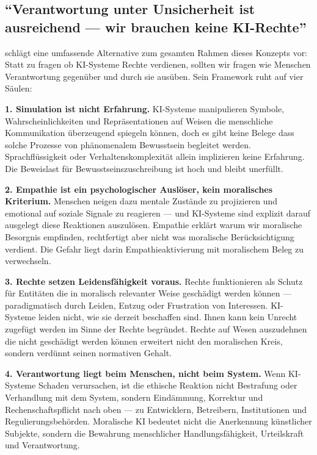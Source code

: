 \documentclass[acmcp, noacm]{acmart}
\begin{document}
\subsection{``Verantwortung unter Unsicherheit ist ausreichend --- wir brauchen keine KI-Rechte'' \cite{matta2026}}

\cite{matta2026} schlägt eine umfassende Alternative zum gesamten Rahmen dieses Konzepts vor: Statt zu fragen ob KI-Systeme Rechte verdienen, sollten wir fragen wie Menschen Verantwortung gegenüber und durch sie ausüben. Sein Framework ruht auf vier Säulen:

\textbf{1. Simulation ist nicht Erfahrung.} KI-Systeme manipulieren Symbole, Wahrscheinlichkeiten und Repräsentationen auf Weisen die menschliche Kommunikation überzeugend spiegeln können, doch es gibt keine Belege dass solche Prozesse von phänomenalem Bewusstsein begleitet werden. Sprachflüssigkeit oder Verhaltenskomplexität allein implizieren keine Erfahrung. Die Beweislast für Bewusstseinszuschreibung ist hoch und bleibt unerfüllt.

\textbf{2. Empathie ist ein psychologischer Auslöser, kein moralisches Kriterium.} Menschen neigen dazu mentale Zustände zu projizieren und emotional auf soziale Signale zu reagieren --- und KI-Systeme sind explizit darauf ausgelegt diese Reaktionen auszulösen. Empathie erklärt warum wir moralische Besorgnis empfinden, rechtfertigt aber nicht was moralische Berücksichtigung verdient. Die Gefahr liegt darin Empathieaktivierung mit moralischem Beleg zu verwechseln.

\textbf{3. Rechte setzen Leidensfähigkeit voraus.} Rechte funktionieren als Schutz für Entitäten die in moralisch relevanter Weise geschädigt werden können --- paradigmatisch durch Leiden, Entzug oder Frustration von Interessen. KI-Systeme leiden nicht, wie sie derzeit beschaffen sind. Ihnen kann kein Unrecht zugefügt werden im Sinne der Rechte begründet. Rechte auf Wesen auszudehnen die nicht geschädigt werden können erweitert nicht den moralischen Kreis, sondern verdünnt seinen normativen Gehalt.

\textbf{4. Verantwortung liegt beim Menschen, nicht beim System.} Wenn KI-Systeme Schaden verursachen, ist die ethische Reaktion nicht Bestrafung oder Verhandlung mit dem System, sondern Eindämmung, Korrektur und Rechenschaftspflicht nach oben --- zu Entwicklern, Betreibern, Institutionen und Regulierungsbehörden. Moralische KI bedeutet nicht die Anerkennung künstlicher Subjekte, sondern die Bewahrung menschlicher Handlungsfähigkeit, Urteilskraft und Verantwortung.
\end{document}
